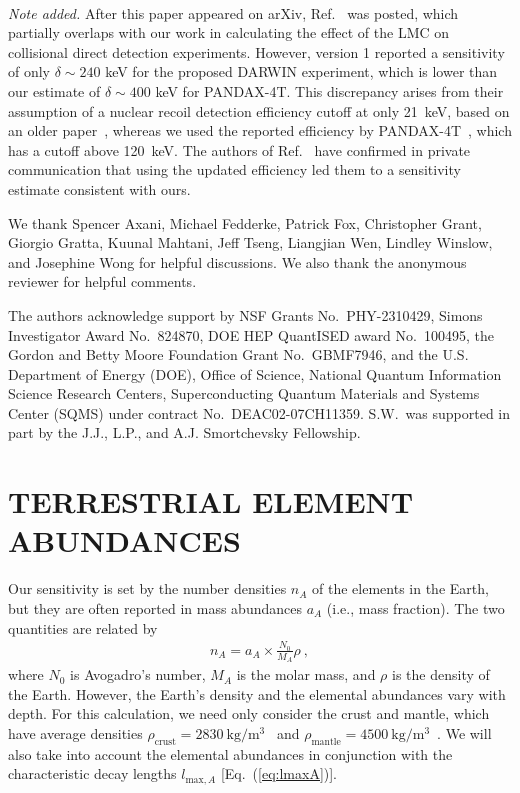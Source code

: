\documentclass[aps,prd,amsmath,amssymb,10pt,letterpaper,balancelastpage,showpacs,superscriptaddress,nofootinbib,floatfix,notitlepage,longbibliography,twocolumn
]{revtex4-2}
\newcommand{\Eq}[1]{Eq.~(#1)}
\newcommand{\lmaxA}{l_{\text{max},A}}
\begin{document}
\FloatBarrier
\textit{\\Note added.} After this paper appeared on arXiv, Ref.~\cite{AlbertaPaper} was posted, which partially overlaps with our work in calculating the effect of the LMC on collisional direct detection experiments. However, version 1 reported a sensitivity of only $\delta \sim 240$ keV for the proposed DARWIN experiment, which is lower than our estimate of $\delta \sim 400$ keV for PANDAX-4T. This discrepancy arises from their assumption of a nuclear recoil detection efficiency cutoff at only 21~keV, based on an older paper~\cite{OutdatedSensitivity}, whereas we used the reported efficiency by PANDAX-4T~\cite{PandaX4T2021}, which has a cutoff above 120~keV. The authors of Ref.~\cite{AlbertaPaper} have confirmed in private communication that using the updated efficiency led them to a sensitivity estimate consistent with ours.

\acknowledgments
We thank Spencer Axani, Michael Fedderke, Patrick Fox, Christopher Grant, Giorgio Gratta, Kuunal Mahtani, Jeff Tseng, Liangjian Wen, Lindley Winslow, and Josephine Wong for helpful discussions. We also thank the anonymous reviewer for helpful comments.

The authors acknowledge support by NSF Grants No.~PHY-2310429, Simons Investigator Award No.~824870, DOE HEP QuantISED award No.~100495, the Gordon and Betty Moore Foundation Grant No.~GBMF7946, and the U.S. Department of Energy (DOE), Office of Science, National Quantum Information Science Research Centers, Superconducting Quantum Materials and Systems Center (SQMS) under contract No.~DEAC02-07CH11359. S.W.~was supported in part by the J.J., L.P., and A.J. Smortchevsky Fellowship.

\renewcommand{\appendixname}{APPENDIX}
\appendix
\section{TERRESTRIAL ELEMENT ABUNDANCES\label{sec:terrestrial elements}}
Our sensitivity is set by the number densities $n_A$ of the elements in the Earth, but they are often reported in mass abundances $a_A$ (i.e., mass fraction). The two quantities are related by
\begin{align}
    n_A = a_A \times \frac{N_0}{M_A} \rho ~,
\end{align}
where $N_0$ is Avogadro's number, $M_A$ is the molar mass, and $\rho$ is the density of the Earth. However, the Earth's density and the elemental abundances vary with depth. For this calculation, we need only consider the crust and mantle, which have average densities $\rho_{\text{crust}}=2830 ~\text{kg}/\text{m}^3$~\cite{crust_density} and $\rho_{\text{mantle}}=4500 ~\text{kg}/\text{m}^3$~\cite{mantleDensity}. We will also take into account the elemental abundances in conjunction with the characteristic decay lengths $\lmaxA$ [\Eq{\ref{eq:lmaxA}}].
\end{document}

